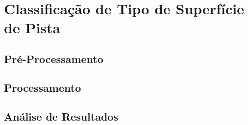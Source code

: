 \chapter{Classificação de Tipo de Superfície de Pista}
\label{cap:classificacao_tipo_superficie}

\section{Pré-Processamento}
\section{Processamento}
\section{Análise de Resultados}
